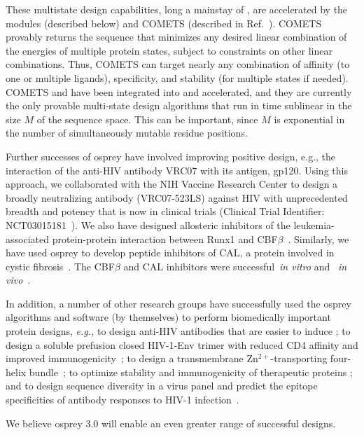 These multistate design capabilities, long a mainstay of \osprey, are accelerated by the modules \bbks (described below) and COMETS (described in Ref.~).  COMETS provably returns the sequence that minimizes any desired linear combination of the energies of multiple protein states, subject to constraints on other linear combinations. Thus, COMETS can target nearly any combination of affinity (to one or multiple ligands), specificity, and stability (for multiple states if needed). COMETS and \bbks have been integrated into  and accelerated, and they are currently the only provable multi-state design algorithms that run in time sublinear in the size $M$ of the sequence space. This can be important, since $M$ is exponential in the number of simultaneously mutable residue positions.

Further successes of {\sc osprey} have involved improving positive design, e.g., the interaction of the anti-HIV antibody VRC07 with its antigen, gp120.  Using this approach, we collaborated with the NIH Vaccine Research Center to design a broadly neutralizing antibody (VRC07-523LS) against HIV with unprecedented breadth and potency that is now in clinical trials (Clinical Trial Identifier: NCT03015181~\cite{VRC07_enhance,clinical605}).  We also have designed allosteric inhibitors of the leukemia-associated protein-protein interaction between Runx1 and CBF$\beta$~\cite{runx1_cbfb}.  Similarly, we have used {\sc osprey} to develop peptide inhibitors of CAL, a protein involved in cystic fibrosis~\cite{CFTR}.  The CBF$\beta$ and CAL inhibitors were successful~\textit{in vitro} and ~\textit{in vivo}~\cite{runx1_cbfb,CFTR}.  

In addition, a number of other research groups have successfully used the {\sc osprey} algorithms and software (by themselves) to perform biomedically important protein designs, {\em e.g.,} to design anti-HIV antibodies that are easier to induce \cite{Georgiev:2014aa}; to design a soluble prefusion closed HIV-1-Env trimer with reduced CD4 affinity and improved immunogenicity~\cite{Gwo-yu17}; to design a transmembrane Zn$^{2+}$-transporting four-helix bundle~\cite{Joh14}; to optimize stability and immunogenicity of therapeutic proteins \cite{Parker:2013aa,Salvat:2015aa,Zhao:2015aa}; and to design sequence diversity in a virus panel and predict the epitope specificities of antibody responses to HIV-1 infection~\cite{polyclonal17}.

We believe {\sc osprey} 3.0 will enable an even greater range of successful designs.  

